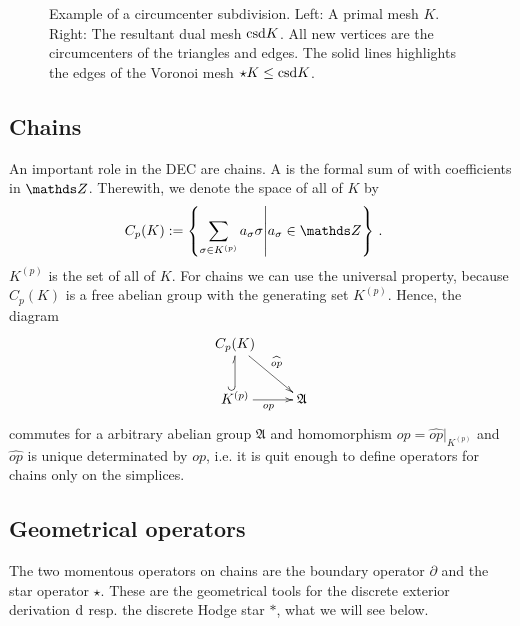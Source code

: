 \begin{figure}
\begin{minipage}[htp]{.24\textwidth}
      \end{minipage}
      \caption{Example of a circumcenter subdivision.
               Left: A primal mesh \( K \).
               Right: The resultant dual mesh \( \text{csd} K \). 
               All new vertices are the circumcenters of the triangles and edges.
               The solid lines highlights the edges of the Voronoi mesh \( \star K \leq \text{csd} K \).}
      \label{figExSubdivision}
    \end{figure}

    \subsection{Chains}
    An important role in the DEC are chains. 
    A  is the formal sum of  with coefficients in \( \Z \). 
    Therewith, we denote the space of all  of \( K \)  by
    \begin{align}
      C_{p}(K) &:= \left\{\sum_{\sigma\in K^{(p)}}a_{\sigma}\sigma \middle| a_{\sigma}\in\Z \right\} \formpunkt
    \end{align}
    \( K^{(p)} \) is the set of all  of \( K \). 
    For chains we can use the universal property, because \( C_{p}(K) \) is a free abelian group with the generating set \( K^{(p)} \).
    Hence, the diagram
    \begin{align}
    \begin{xy}
      \xymatrix{
        C_{p}(K) \ar[rd]^{\widehat{op}} & \\
        K^{(p)} \ar@^{(->}[u] \ar[r]_{op}& \mathfrak{A}
      }
    \end{xy}
  \end{align}
  commutes for a arbitrary abelian group \( \mathfrak{A} \) and homomorphism \( op = \widehat{op}|_{K^{(p)}} \) 
  and \( \widehat{op} \) is unique determinated by \( op \),
  i.e. it is quit enough to define operators for chains only on the simplices. 
  
  \subsection{Geometrical operators}
    The two momentous operators on chains are the boundary operator \( \partial \) and the star operator \( \star \).
    These are the geometrical tools for the discrete exterior derivation \( \mathrm{d} \) resp. the discrete Hodge star \( * \),
    what we will see below.

